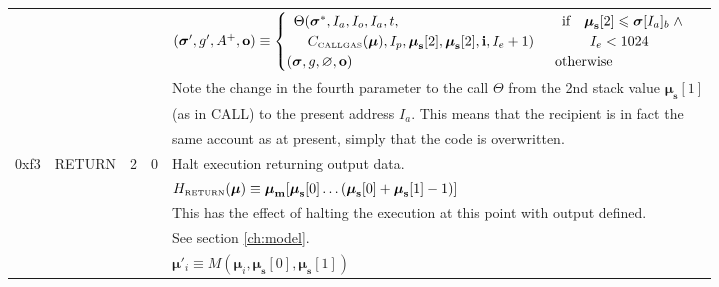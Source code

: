 \documentclass[9pt,oneside]{amsart}
\begin{document}
\begin{tabular*}{\columnwidth}[h]{rlrrl}
&&&& $(\boldsymbol{\sigma}', g', A^+, \mathbf{o}) \equiv \begin{cases}\begin{array}{l}\Theta(\boldsymbol{\sigma}^*, I_a, I_o, I_a, t,\\\quad C_{\text{\tiny CALLGAS}}(\boldsymbol{\mu}), I_p, \boldsymbol{\mu}_\mathbf{s}[2], \boldsymbol{\mu}_\mathbf{s}[2], \mathbf{i}, I_e + 1)\end{array} & \begin{array}{l}\text{if} \quad \boldsymbol{\mu}_\mathbf{s}[2] \leqslant \boldsymbol{\sigma}[I_a]_b \;\wedge\\ \quad\quad{}I_e < 1024\end{array} \\ (\boldsymbol{\sigma}, g, \varnothing, \mathbf{o}) & \text{otherwise} \end{cases}$ \\
&&&& Note the change in the fourth parameter to the call $\Theta$ from the 2nd stack value $\boldsymbol{\mu}_\mathbf{s}[1]$\\
&&&& (as in {\small CALL}) to the present address $I_a$. This means that the recipient is in fact the\\
&&&& same account as at present, simply that the code is overwritten.\\
\midrule
0xf3 & {\small RETURN} & 2 & 0 & Halt execution returning output data. \\
&&&& $H_{\text{\tiny RETURN}}(\boldsymbol{\mu}) \equiv \boldsymbol{\mu}_\mathbf{m}[ \boldsymbol{\mu}_\mathbf{s}[0] \dots ( \boldsymbol{\mu}_\mathbf{s}[0] + \boldsymbol{\mu}_\mathbf{s}[1] - 1 ) ]$ \\
&&&& This has the effect of halting the execution at this point with output defined.\\
&&&& See section \ref{ch:model}. \\
&&&& $\boldsymbol{\mu}'_i \equiv M(\boldsymbol{\mu}_i, \boldsymbol{\mu}_\mathbf{s}[0], \boldsymbol{\mu}_\mathbf{s}[1])$ \\
\end{tabular*}
\end{document}
